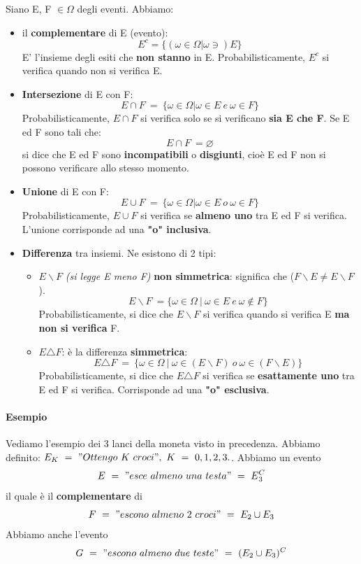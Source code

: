 \documentclass{report}
\begin{document}
Siano E, F \(\in \Omega\) degli eventi. Abbiamo:
\begin{itemize}
    \item il \textbf{complementare} di E (evento):
    \[E^c = \{(\omega \in \Omega | \omega \ni)E\}\]
    E' l'insieme degli esiti che \textbf{non stanno} in E.
    Probabilisticamente, \(E^c\) si verifica quando non si verifica E.
    \item \textbf{Intersezione} di E con F: \[E \cap F\ =\ \{\omega \in \Omega | \omega \in E\ e\ \omega \in F\}\] Probabilisticamente, \(E \cap F\) si verifica solo se si verificano \textbf{sia E che F}. Se E ed F sono tali che: \[E \cap F\ = \varnothing \] si dice che E ed F sono \textbf{incompatibili} o \textbf{disgiunti}, cioè E ed F non si possono verificare allo stesso momento.
    \item \textbf{Unione} di E con F: \[E \cup F\ =\ \{\omega \in \Omega | \omega\in E\ o\ \omega \in F\}\] Probabilisticamente, \(E \cup F\) si verifica se \textbf{almeno uno} tra E ed F si verifica. L'unione corrisponde ad una \textbf{"o" inclusiva}.
    \item \textbf{Differenza} tra insiemi. Ne esistono di 2 tipi:
    \begin{itemize}
        \item \(E\backslash F\) \textit{(si legge E meno F)} \textbf{non simmetrica}: significa che (\(F\backslash E \neq E\backslash F\)). \[E\backslash F\ = \{\omega \in \Omega\ |\ \omega \in E\ e\ \omega \not\in F\}\]
        Probabilisticamente, si dice che \(E\backslash F\) si verifica quando si verifica E \textbf{ma non si verifica} F.
        \item \(E \triangle F\): è la differenza \textbf{simmetrica}: \[E \triangle F\ =\ \{\omega \in \Omega\ |\ \omega \in (E\backslash F)\ o\ \omega \in (F \backslash E)\}\] Probabilisticamente, si dice che \(E \triangle F \) si verifica se \textbf{esattamente uno} tra E ed F si verifica. Corrisponde ad una \textbf{"o" esclusiva}.
    \end{itemize}
\end{itemize}
\paragraph{Esempio} 
Vediamo l'esempio dei 3 lanci della moneta visto in precedenza. Abbiamo definito: \(E_K\ =\ "Ottengo\ K\ croci",\ K\ =\ 0,1,2,3. \). Abbiamo un evento \[E\ =\ "esce\ almeno\ una\ testa"\ =\ E{^C_3}\] il quale è il \textbf{complementare} di \[F\ =\ "escono\ almeno\ 2\ croci"\ =\ E_2 \cup E_3\] Abbiamo anche l'evento \[G\ =\ "escono\ almeno\ due\ teste"\ =\ (E_2 \cup E_3)^C\]
\end{document}
